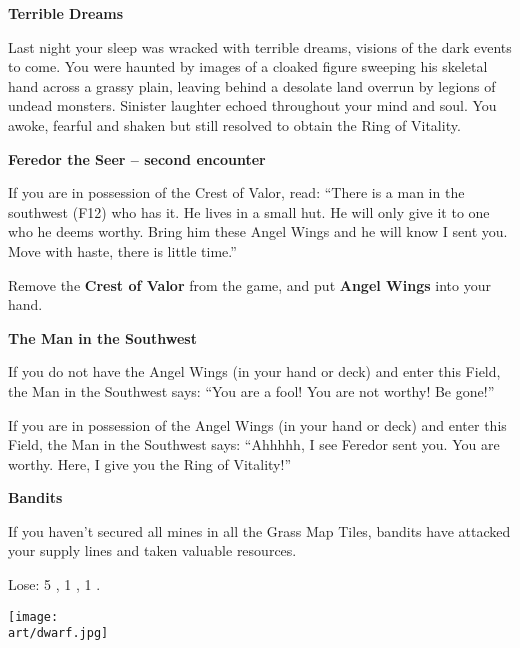\begin{multicols*}{2}
\textbf{Terrible Dreams}

Last night your sleep was wracked with terrible dreams, visions of the dark events to come.
You were haunted by images of a cloaked figure sweeping his skeletal hand across a grassy plain, leaving behind a desolate land overrun by legions of undead monsters.
Sinister laughter echoed throughout your mind and soul.
You awoke, fearful and shaken but still resolved to obtain the Ring of Vitality.

\textbf{Feredor the Seer -- second encounter}

If you are in possession of the Crest of Valor, read: ``There is a man in the southwest (F12) who has it.
He lives in a small hut.
He will only give it to one who he deems worthy.
Bring him these Angel Wings and he will know I sent you.
Move with haste, there is little time.''

\textcolor{darkcandyapplered}{Remove the \textbf{Crest of Valor} from the game, and put \textbf{Angel Wings} into your hand.}

\textbf{The Man in the Southwest}

If you do not have the Angel Wings (in your hand or deck) and enter this Field, the Man in the Southwest says: ``You are a fool! You are not worthy! Be gone!''  %

If you are in possession of the Angel Wings (in your hand or deck) and enter this Field, the Man in the Southwest says: ``Ahhhhh, I see Feredor sent you.  %
You are worthy.
Here, I give you the Ring of Vitality!''

\textbf{Bandits}

If you haven't secured all mines in all the Grass Map Tiles, bandits have attacked your supply lines and taken valuable resources.

\textcolor{darkcandyapplered}{Lose: 5 , 1 , 1 .}

\vspace*{\fill}
\texttt{[image: \\art/dwarf.jpg]}

\end{multicols*}
